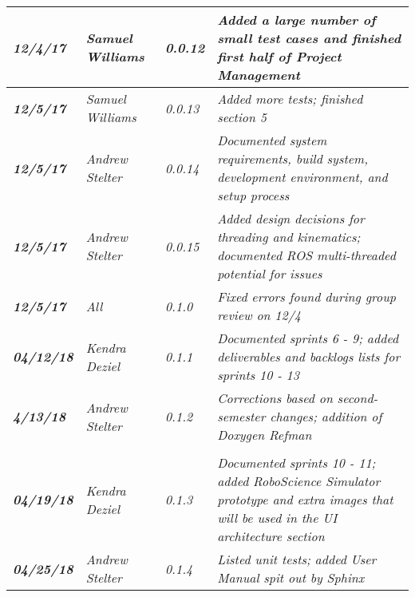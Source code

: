 \begin{tabular}{|>{\raggedright}p{1.5cm}|>{\raggedright}p{3cm}|>{\raggedright}p{1.5cm}|>{\raggedright}p{9cm}|}
\hline
\textit{\textbf{12/4/17}} & \textit{Samuel Williams} & \textit{0.0.12} & \textit{Added a large number of small test cases and finished first half of Project Management}\tabularnewline
\hline
\textit{\textbf{12/5/17}} & \textit{Samuel Williams} & \textit{0.0.13} & \textit{Added more tests; finished section 5}\tabularnewline
\hline
\textit{\textbf{12/5/17}} & \textit{Andrew Stelter} & \textit{0.0.14} & \textit{Documented system requirements, build system, development environment, and setup process}\tabularnewline
\hline
\textit{\textbf{12/5/17}} & \textit{Andrew Stelter} & \textit{0.0.15} & \textit{Added design decisions for threading and kinematics; documented ROS multi-threaded potential for issues}\tabularnewline
\hline
\textit{\textbf{12/5/17}} & \textit{All} & \textit{0.1.0} & \textit{Fixed errors found during group review on 12/4}\tabularnewline
\hline
\textit{\textbf{04/12/18}} & \textit{Kendra Deziel} & \textit{0.1.1} & \textit{Documented sprints 6 - 9; added deliverables and backlogs lists for sprints 10 - 13}\tabularnewline
\hline
\textit{\textbf{4/13/18}} & \textit{Andrew Stelter} & \textit{0.1.2} & \textit{Corrections based on second-semester changes; addition of Doxygen Refman}\tabularnewline \tabularnewline
\hline
\textit{\textbf{04/19/18}} & \textit{Kendra Deziel} & \textit{0.1.3} & \textit{Documented sprints 10 - 11; added RoboScience Simulator prototype and extra images that will be used in the UI architecture section}\tabularnewline
\hline
\textit{\textbf{04/25/18}} & \textit{Andrew Stelter} & \textit{0.1.4} & \textit{Listed unit tests; added User Manual spit out by Sphinx}\tabularnewline
\hline
\end{tabular}
\vfill

